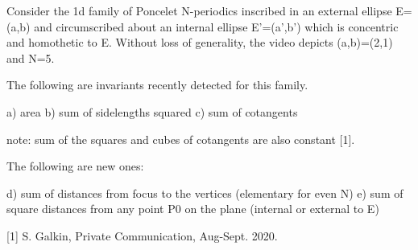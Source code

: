 Consider the 1d family of Poncelet N-periodics inscribed in an external ellipse E=(a,b) and circumscribed about an internal ellipse E'=(a',b') which is concentric and homothetic to E. Without loss of generality, the video depicts (a,b)=(2,1) and N=5.

The following are invariants recently detected for this family.

a) area
b) sum of sidelengths squared
c) sum of cotangents

note: sum of the squares and cubes of cotangents are also constant [1].

The following are new ones:

d) sum of distances from focus to the vertices (elementary for even N)
e) sum of square distances from any point P0 on the plane (internal or external to E)

[1] S. Galkin, Private Communication, Aug-Sept. 2020.